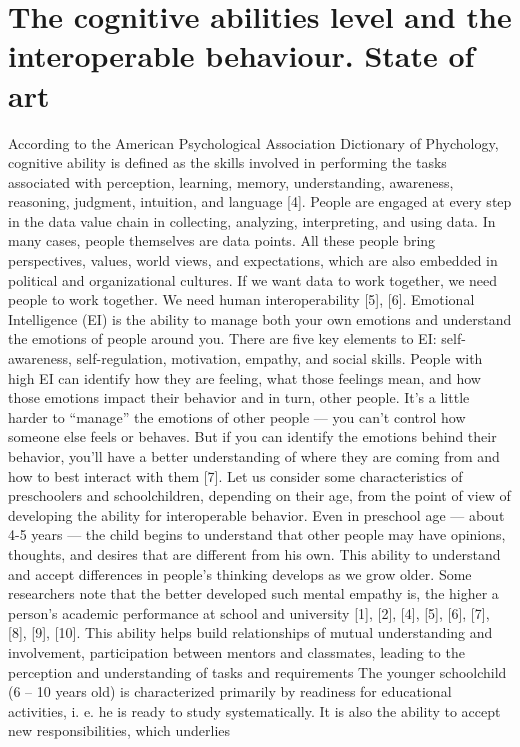 \documentclass[twocolumn]{article}
\begin{document}
\section{ The cognitive abilities level and the interoperable
behaviour. State of art}
According to the American Psychological Association
Dictionary of Phychology, cognitive ability is defined as
the skills involved in performing the tasks associated with
perception, learning, memory, understanding, awareness,
reasoning, judgment, intuition, and language [4].
People are engaged at every step in the data value
chain in collecting, analyzing, interpreting, and using
data. In many cases, people themselves are data points.
All these people bring perspectives, values, world views,
and expectations, which are also embedded in political
and organizational cultures. If we want data to work
together, we need people to work together. We need
human interoperability [5], [6].
Emotional Intelligence (EI) is the ability to manage
both your own emotions and understand the emotions of
people around you. There are five key elements to EI:
self-awareness, self-regulation, motivation, empathy, and
social skills. People with high EI can identify how they
are feeling, what those feelings mean, and how those
emotions impact their behavior and in turn, other people.
It’s a little harder to “manage” the emotions of other
people — you can’t control how someone else feels or behaves. But if you can identify the emotions behind their
behavior, you’ll have a better understanding of where
they are coming from and how to best interact with
them [7].
Let us consider some characteristics of preschoolers
and schoolchildren, depending on their age, from the
point of view of developing the ability for interoperable
behavior.
Even in preschool age — about 4-5 years — the
child begins to understand that other people may have
opinions, thoughts, and desires that are different from his
own. This ability to understand and accept differences
in people’s thinking develops as we grow older. Some
researchers note that the better developed such mental
empathy is, the higher a person’s academic performance
at school and university [1], [2], [4], [5], [6], [7], [8],
[9], [10]. This ability helps build relationships of mutual
understanding and involvement, participation between
mentors and classmates, leading to the perception and
understanding of tasks and requirements The younger schoolchild (6 – 10 years old) is characterized primarily by readiness for educational activities,
i. e. he is ready to study systematically. It is also the
ability to accept new responsibilities, which underlies
\end{document}
